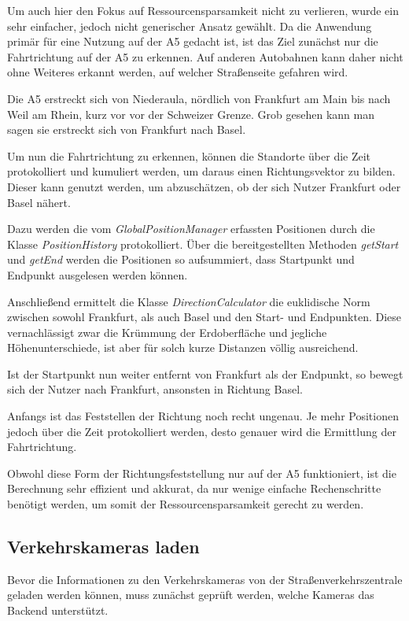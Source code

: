 Um auch hier den Fokus auf Ressourcensparsamkeit nicht zu verlieren, wurde ein sehr einfacher, jedoch nicht generischer Ansatz gewählt.
Da die Anwendung primär für eine Nutzung auf der A5 gedacht ist, ist das Ziel zunächst nur die Fahrtrichtung auf der A5 zu erkennen.
Auf anderen Autobahnen kann daher nicht ohne Weiteres erkannt werden, auf welcher Straßenseite gefahren wird.

Die A5 erstreckt sich von Niederaula, nördlich von Frankfurt am Main bis nach Weil am Rhein, kurz vor vor der Schweizer Grenze. Grob gesehen kann man sagen sie erstreckt sich von Frankfurt nach Basel.

Um nun die Fahrtrichtung zu erkennen, können die Standorte über die Zeit protokolliert und kumuliert werden, um daraus einen Richtungsvektor zu bilden.
Dieser kann genutzt werden, um abzuschätzen, ob der sich Nutzer Frankfurt oder Basel nähert.

Dazu werden die vom {\em GlobalPositionManager} erfassten Positionen durch die Klasse {\em PositionHistory} protokolliert.
Über die bereitgestellten Methoden {\em getStart} und {\em getEnd} werden die Positionen so aufsummiert, dass Startpunkt und Endpunkt ausgelesen werden können.

Anschließend ermittelt die Klasse {\em DirectionCalculator} die euklidische Norm zwischen sowohl Frankfurt, als auch Basel und den Start- und Endpunkten.
Diese vernachlässigt zwar die Krümmung der Erdoberfläche und jegliche Höhenunterschiede, ist aber für solch kurze Distanzen völlig ausreichend.

Ist der Startpunkt nun weiter entfernt von Frankfurt als der Endpunkt, so bewegt sich der Nutzer nach Frankfurt, ansonsten in Richtung Basel.

Anfangs ist das Feststellen der Richtung noch recht ungenau. Je mehr Positionen jedoch über die Zeit protokolliert werden, desto genauer wird die Ermittlung der Fahrtrichtung.

Obwohl diese Form der Richtungsfeststellung nur auf der A5 funktioniert, ist die Berechnung sehr effizient und akkurat, da nur wenige einfache Rechenschritte benötigt werden, um somit der Ressourcensparsamkeit gerecht zu werden.

\subsection{Verkehrskameras laden}
Bevor die Informationen zu den Verkehrskameras von der Straßenverkehrszentrale geladen werden können, muss zunächst geprüft werden, welche Kameras das Backend unterstützt.


